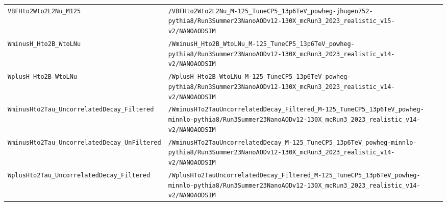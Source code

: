 \begin{longtable}{@{}>{\RaggedRight\arraybackslash}p{} >{\RaggedRight\arraybackslash}p{}@{}}
\addlinespace[2pt]
\texttt{VBFHto2Wto2L2Nu\_\allowbreak{}M125} & \texttt{/\allowbreak{}VBFHto2Wto2L2Nu\_\allowbreak{}M-\allowbreak{}125\_\allowbreak{}TuneCP5\_\allowbreak{}13p6TeV\_\allowbreak{}powheg-\allowbreak{}jhugen752-\allowbreak{}pythia8/\allowbreak{}Run3Summer23NanoAODv12-\allowbreak{}130X\_\allowbreak{}mcRun3\_\allowbreak{}2023\_\allowbreak{}realistic\_\allowbreak{}v15-\allowbreak{}v2/\allowbreak{}NANOAODSIM} \\
\addlinespace[2pt]
\texttt{WminusH\_\allowbreak{}Hto2B\_\allowbreak{}WtoLNu} & \texttt{/\allowbreak{}WminusH\_\allowbreak{}Hto2B\_\allowbreak{}WtoLNu\_\allowbreak{}M-\allowbreak{}125\_\allowbreak{}TuneCP5\_\allowbreak{}13p6TeV\_\allowbreak{}powheg-\allowbreak{}pythia8/\allowbreak{}Run3Summer23NanoAODv12-\allowbreak{}130X\_\allowbreak{}mcRun3\_\allowbreak{}2023\_\allowbreak{}realistic\_\allowbreak{}v14-\allowbreak{}v2/\allowbreak{}NANOAODSIM} \\
\addlinespace[2pt]
\texttt{WplusH\_\allowbreak{}Hto2B\_\allowbreak{}WtoLNu} & \texttt{/\allowbreak{}WplusH\_\allowbreak{}Hto2B\_\allowbreak{}WtoLNu\_\allowbreak{}M-\allowbreak{}125\_\allowbreak{}TuneCP5\_\allowbreak{}13p6TeV\_\allowbreak{}powheg-\allowbreak{}pythia8/\allowbreak{}Run3Summer23NanoAODv12-\allowbreak{}130X\_\allowbreak{}mcRun3\_\allowbreak{}2023\_\allowbreak{}realistic\_\allowbreak{}v14-\allowbreak{}v2/\allowbreak{}NANOAODSIM} \\
\addlinespace[2pt]
\texttt{WminusHto2Tau\_\allowbreak{}UncorrelatedDecay\_\allowbreak{}Filtered} & \texttt{/\allowbreak{}WminusHTo2TauUncorrelatedDecay\_\allowbreak{}Filtered\_\allowbreak{}M-\allowbreak{}125\_\allowbreak{}TuneCP5\_\allowbreak{}13p6TeV\_\allowbreak{}powheg-\allowbreak{}minnlo-\allowbreak{}pythia8/\allowbreak{}Run3Summer23NanoAODv12-\allowbreak{}130X\_\allowbreak{}mcRun3\_\allowbreak{}2023\_\allowbreak{}realistic\_\allowbreak{}v14-\allowbreak{}v2/\allowbreak{}NANOAODSIM} \\
\addlinespace[2pt]
\texttt{WminusHto2Tau\_\allowbreak{}UncorrelatedDecay\_\allowbreak{}UnFiltered} & \texttt{/\allowbreak{}WminusHTo2TauUncorrelatedDecay\_\allowbreak{}M-\allowbreak{}125\_\allowbreak{}TuneCP5\_\allowbreak{}13p6TeV\_\allowbreak{}powheg-\allowbreak{}minnlo-\allowbreak{}pythia8/\allowbreak{}Run3Summer23NanoAODv12-\allowbreak{}130X\_\allowbreak{}mcRun3\_\allowbreak{}2023\_\allowbreak{}realistic\_\allowbreak{}v14-\allowbreak{}v2/\allowbreak{}NANOAODSIM} \\
\addlinespace[2pt]
\texttt{WplusHto2Tau\_\allowbreak{}UncorrelatedDecay\_\allowbreak{}Filtered} & \texttt{/\allowbreak{}WplusHTo2TauUncorrelatedDecay\_\allowbreak{}Filtered\_\allowbreak{}M-\allowbreak{}125\_\allowbreak{}TuneCP5\_\allowbreak{}13p6TeV\_\allowbreak{}powheg-\allowbreak{}minnlo-\allowbreak{}pythia8/\allowbreak{}Run3Summer23NanoAODv12-\allowbreak{}130X\_\allowbreak{}mcRun3\_\allowbreak{}2023\_\allowbreak{}realistic\_\allowbreak{}v14-\allowbreak{}v2/\allowbreak{}NANOAODSIM} \\

\end{longtable}
